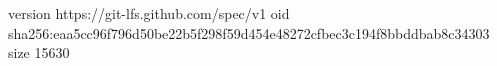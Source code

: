 version https://git-lfs.github.com/spec/v1
oid sha256:eaa5cc96f796d50be22b5f298f59d454e48272cfbec3c194f8bbddbab8c34303
size 15630
